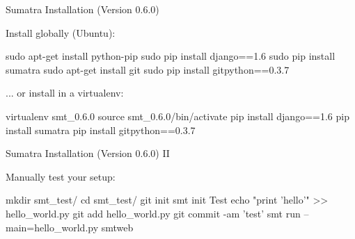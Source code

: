 \begin{frame}[fragile]{Sumatra Installation (Version 0.6.0)}

  \vspace{0.2cm}
  Install globally (Ubuntu):
  \vspace{0.15cm}
  \begin{mlineshell}
    sudo apt-get install python-pip
    sudo pip install django==1.6
    sudo pip install sumatra
    sudo apt-get install git
    sudo pip install gitpython==0.3.7
  \end{mlineshell}

  \vspace{0.35cm}

  ... or install in a virtualenv:
\vspace{0.15cm}
  \begin{mlineshell}
    virtualenv smt_0.6.0
    source smt_0.6.0/bin/activate
    pip install django==1.6
    pip install sumatra
    pip install gitpython==0.3.7
  \end{mlineshell}

\end{frame}


\begin{frame}[fragile]{Sumatra Installation (Version 0.6.0) II}

  \vspace{0.2cm}
  Manually test your setup:
  \vspace{0.1cm}
  \begin{mlineshell}
    mkdir smt_test/
    cd smt_test/
    git init
    smt init Test
    echo "print 'hello'" >> hello_world.py
    git add hello_world.py
    git commit -am 'test'
    smt run --main=hello_world.py
    smtweb
  \end{mlineshell}

\end{frame}




